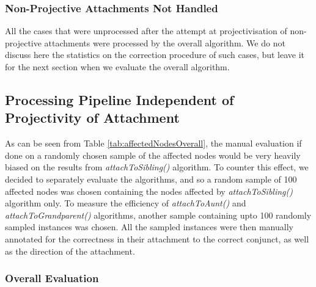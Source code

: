 \subsubsection{Non-Projective Attachments Not Handled}

All the cases that were unprocessed after the attempt at projectivisation of non-projective attachments were processed by the overall algorithm. We do not discuss here the statistics on the correction procedure of such cases, but leave it for the next section when we evaluate the overall algorithm. 

\subsection{Processing Pipeline Independent of Projectivity of Attachment}

As can be seen from Table \ref{tab:affectedNodesOverall}, the manual evaluation if done on a randomly chosen sample of the affected nodes would be very heavily biased on the results from \textit{attachToSibling()} algorithm. To counter this effect, we decided to separately evaluate the algorithms, and so a random sample of 100 affected nodes was chosen containing the nodes affected by \textit{attachToSibling()} algorithm only. To measure the efficiency of \textit{attachToAunt()} and \textit{attachToGrandparent()} algorithms, another sample containing upto 100 randomly sampled instances was chosen. All the sampled instances were then manually annotated for the correctness in their attachment to the correct conjunct, as well as the direction of the attachment.

\begin{table}[H]
    \centering
    \caption{Nodes Affected: Overall}
    \label{tab:affectedNodesOverall}
\end{table}

\subsubsection{Overall Evaluation}

